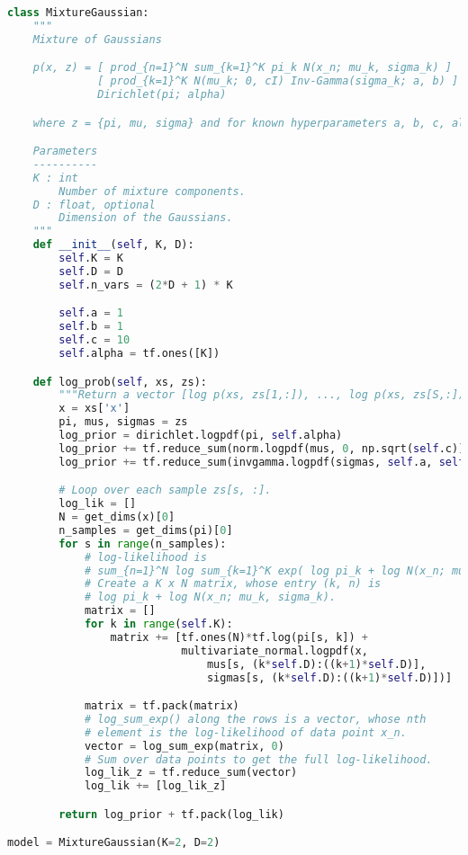 \begin{lstlisting}[language=Python]
class MixtureGaussian:
    """
    Mixture of Gaussians

    p(x, z) = [ prod_{n=1}^N sum_{k=1}^K pi_k N(x_n; mu_k, sigma_k) ]
              [ prod_{k=1}^K N(mu_k; 0, cI) Inv-Gamma(sigma_k; a, b) ]
              Dirichlet(pi; alpha)

    where z = {pi, mu, sigma} and for known hyperparameters a, b, c, alpha.

    Parameters
    ----------
    K : int
        Number of mixture components.
    D : float, optional
        Dimension of the Gaussians.
    """
    def __init__(self, K, D):
        self.K = K
        self.D = D
        self.n_vars = (2*D + 1) * K

        self.a = 1
        self.b = 1
        self.c = 10
        self.alpha = tf.ones([K])

    def log_prob(self, xs, zs):
        """Return a vector [log p(xs, zs[1,:]), ..., log p(xs, zs[S,:])]."""
        x = xs['x']
        pi, mus, sigmas = zs
        log_prior = dirichlet.logpdf(pi, self.alpha)
        log_prior += tf.reduce_sum(norm.logpdf(mus, 0, np.sqrt(self.c)), 1)
        log_prior += tf.reduce_sum(invgamma.logpdf(sigmas, self.a, self.b), 1)

        # Loop over each sample zs[s, :].
        log_lik = []
        N = get_dims(x)[0]
        n_samples = get_dims(pi)[0]
        for s in range(n_samples):
            # log-likelihood is
            # sum_{n=1}^N log sum_{k=1}^K exp( log pi_k + log N(x_n; mu_k, sigma_k) )
            # Create a K x N matrix, whose entry (k, n) is
            # log pi_k + log N(x_n; mu_k, sigma_k).
            matrix = []
            for k in range(self.K):
                matrix += [tf.ones(N)*tf.log(pi[s, k]) +
                           multivariate_normal.logpdf(x,
                               mus[s, (k*self.D):((k+1)*self.D)],
                               sigmas[s, (k*self.D):((k+1)*self.D)])]

            matrix = tf.pack(matrix)
            # log_sum_exp() along the rows is a vector, whose nth
            # element is the log-likelihood of data point x_n.
            vector = log_sum_exp(matrix, 0)
            # Sum over data points to get the full log-likelihood.
            log_lik_z = tf.reduce_sum(vector)
            log_lik += [log_lik_z]

        return log_prior + tf.pack(log_lik)

model = MixtureGaussian(K=2, D=2)
\end{lstlisting}

